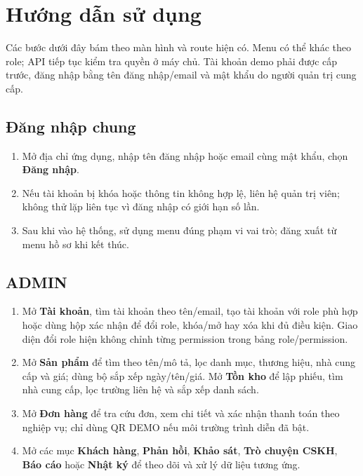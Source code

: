 \section{Hướng dẫn sử dụng}
Các bước dưới đây bám theo màn hình và route hiện có. Menu có thể khác theo role; API tiếp tục kiểm tra quyền ở máy chủ. Tài khoản demo phải được cấp trước, đăng nhập bằng tên đăng nhập/email và mật khẩu do người quản trị cung cấp.

\subsection*{Đăng nhập chung}
\begin{enumerate}
\item Mở địa chỉ ứng dụng, nhập tên đăng nhập hoặc email cùng mật khẩu, chọn \textbf{Đăng nhập}.
\item Nếu tài khoản bị khóa hoặc thông tin không hợp lệ, liên hệ quản trị viên; không thử lặp liên tục vì đăng nhập có giới hạn số lần.
\item Sau khi vào hệ thống, sử dụng menu đúng phạm vi vai trò; đăng xuất từ menu hồ sơ khi kết thúc.
\end{enumerate}

\subsection*{ADMIN}
\begin{enumerate}
\item Mở \textbf{Tài khoản}, tìm tài khoản theo tên/email, tạo tài khoản với role phù hợp hoặc dùng hộp xác nhận để đổi role, khóa/mở hay xóa khi đủ điều kiện. Giao diện đổi role hiện không chỉnh từng permission trong bảng role/permission.
\item Mở \textbf{Sản phẩm} để tìm theo tên/mô tả, lọc danh mục, thương hiệu, nhà cung cấp và giá; dùng bộ sắp xếp ngày/tên/giá. Mở \textbf{Tồn kho} để lập phiếu, tìm nhà cung cấp, lọc trường liên hệ và sắp xếp danh sách.
\item Mở \textbf{Đơn hàng} để tra cứu đơn, xem chi tiết và xác nhận thanh toán theo nghiệp vụ; chỉ dùng QR DEMO nếu môi trường trình diễn đã bật.
\item Mở các mục \textbf{Khách hàng}, \textbf{Phản hồi}, \textbf{Khảo sát}, \textbf{Trò chuyện CSKH}, \textbf{Báo cáo} hoặc \textbf{Nhật ký} để theo dõi và xử lý dữ liệu tương ứng.
\end{enumerate}

